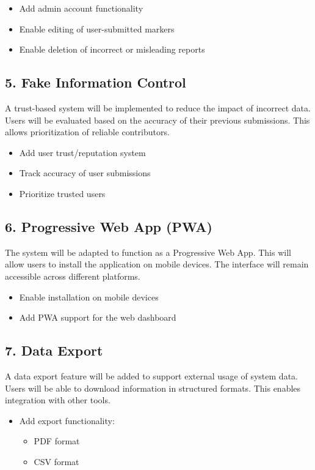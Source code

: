\documentclass[12pt,a4paper]{report}
\begin{document}
\begin{itemize}
    \item Add admin account functionality
    \item Enable editing of user-submitted markers
    \item Enable deletion of incorrect or misleading reports
\end{itemize}

\subsection*{5. Fake Information Control}
A trust-based system will be implemented to reduce the impact of incorrect data. Users will be evaluated based on the accuracy of their previous submissions. This allows prioritization of reliable contributors.

\begin{itemize}
    \item Add user trust/reputation system
    \item Track accuracy of user submissions
    \item Prioritize trusted users
\end{itemize}

\subsection*{6. Progressive Web App (PWA)}
The system will be adapted to function as a Progressive Web App. This will allow users to install the application on mobile devices. The interface will remain accessible across different platforms.

\begin{itemize}
    \item Enable installation on mobile devices
    \item Add PWA support for the web dashboard
\end{itemize}

\subsection*{7. Data Export}
A data export feature will be added to support external usage of system data. Users will be able to download information in structured formats. This enables integration with other tools.

\begin{itemize}
    \item Add export functionality:
    \begin{itemize}
        \item PDF format
        \item CSV format
    \end{itemize}
\end{itemize}
\end{document}
